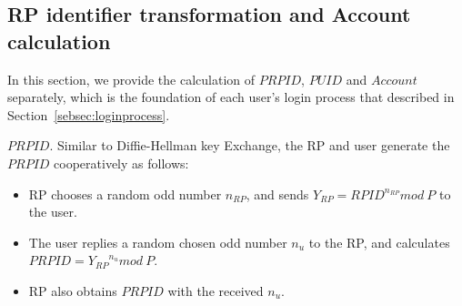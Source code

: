 \subsection{RP identifier transformation and Account calculation}
\label{subsec:identifier-generation}
In this section, we provide the calculation of $PRPID$, $PUID$ and $Account$ separately, which is the foundation of each user's login process that described in Section~\ref{sebsec:loginprocess}.

{$PRPID$}. Similar to Diffie-Hellman key Exchange\cite{DiffieH76}, the RP and user generate the  $PRPID$ cooperatively as follows:
\begin{itemize}
  \item RP chooses a random odd number $n_{RP}$, and sends $Y_{RP} = {RPID}^{n_{RP}} mod \ P$ to the user.
  \item The user replies a random chosen odd number $n_{u}$ to the RP, and calculates $PRPID = {Y_{RP}}^{n_{u}} mod \ P$.
  \item RP also obtains $PRPID$ with the received $n_{u}$.
\end{itemize}


